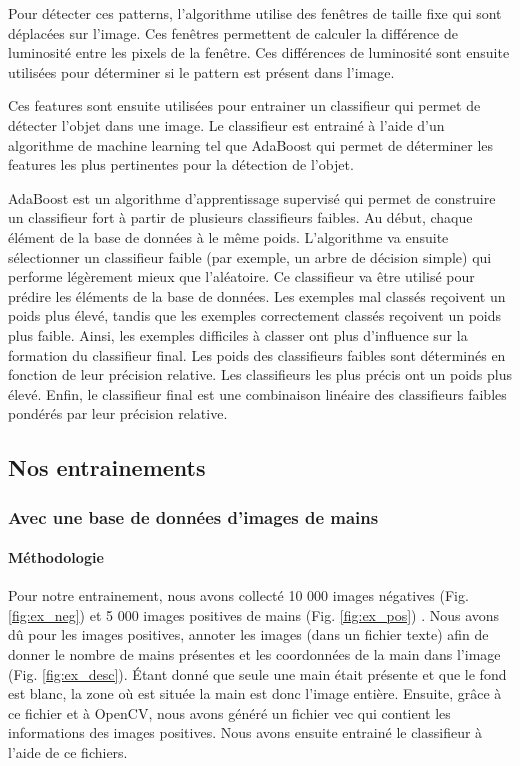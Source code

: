 \documentclass[11pt]{article}
\begin{document}
\bigbreak

Pour détecter ces patterns, l'algorithme utilise des fenêtres de taille fixe qui sont déplacées sur l'image. Ces fenêtres permettent de calculer la différence de luminosité entre les pixels de la fenêtre. Ces différences de luminosité sont ensuite utilisées pour déterminer si le pattern est présent dans l'image. 

\bigbreak

Ces features sont ensuite utilisées pour entrainer un classifieur qui permet de détecter l'objet dans une image. Le classifieur est entrainé à l'aide d'un algorithme de machine learning tel que AdaBoost \cite{adaboost} qui permet de déterminer les features les plus pertinentes pour la détection de l'objet. \bigbreak

AdaBoost est un algorithme d'apprentissage supervisé qui permet de construire un classifieur fort à partir de plusieurs classifieurs faibles.
Au début, chaque élément de la base de données à le même poids. L'algorithme va ensuite sélectionner un classifieur faible (par exemple, un arbre de décision simple) qui performe légèrement mieux que l'aléatoire. Ce classifieur va être utilisé pour prédire les éléments de la base de données. Les exemples mal classés reçoivent un poids plus élevé, tandis que les exemples correctement classés reçoivent un poids plus faible. Ainsi, les exemples difficiles à classer ont plus d'influence sur la formation du classifieur final. Les poids des classifieurs faibles sont déterminés en fonction de leur précision relative. Les classifieurs les plus précis ont un poids plus élevé. Enfin, le classifieur final est une combinaison linéaire des classifieurs faibles pondérés par leur précision relative.

\subsection{Nos entrainements}
\subsubsection{Avec une base de données d'images de mains}
\paragraph{Méthodologie}
Pour notre entrainement, nous avons collecté 10 000 images négatives (Fig. \ref{fig:ex_neg}) \cite{negatives, bdd_animal} et 5 000 images positives de mains (Fig. \ref{fig:ex_pos}) \cite{afifi201911kHands}. Nous avons dû pour les images positives, annoter les images (dans un fichier texte) afin de donner le nombre de mains présentes et les coordonnées de la main dans l'image (Fig. \ref{fig:ex_desc}). \'Etant donné que seule une main était présente et que le fond est blanc, la zone où est située la main est donc l'image entière. Ensuite, grâce à ce fichier et à OpenCV, nous avons généré un fichier vec qui contient les informations des images positives. Nous avons ensuite entrainé le classifieur à l'aide de ce fichiers.
\bigbreak
\end{document}
